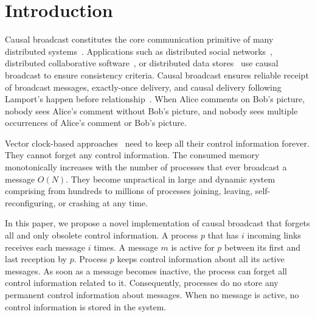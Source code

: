  
\section{Introduction}

Causal broadcast constitutes the core communication primitive of many
distributed systems~\cite{hadzilacos1994modular}. Applications such as
distributed social networks~\cite{borthakur2013petabyte}, distributed
collaborative software~\cite{heinrich2012exploiting,nedelec2016crate}, or
distributed data
stores~\cite{bailis2013bolton,bravo2017saturn,demers1987epidemic,lloyd2011cops,shapiro2011comprehensive}
use causal broadcast to ensure consistency criteria.  Causal broadcast ensures
reliable receipt of broadcast messages, exactly-once delivery, and causal
delivery following Lamport's happen before
relationship~\cite{lamport1978time}. When Alice comments on Bob's picture,
nobody sees Alice's comment without Bob's picture, and nobody sees multiple
occurrences of Alice's comment or Bob's picture.

Vector clock-based
approaches~\cite{malkhi2007concise,mukund2014optimized,nedelec2018pcbroadcast}
need to keep all their control information forever. They cannot forget any
control information.  The consumed memory monotonically increases with the
number of processes that ever broadcast a message $O(N)$.  They become
unpractical in large and dynamic system comprising from hundreds to millions of
processes joining, leaving, self-reconfiguring, or crashing at any time.

In this paper, we propose a novel implementation of causal broadcast that
forgets all and only obsolete control information. A process $p$ that has $i$
incoming links receives each message $i$ times. A message $m$ is active for $p$
between its first and last reception by $p$. Process $p$ keeps control
information about all its active messages. As soon as a message becomes
inactive, the process can forget all control information related to it.
Consequently, processes do no store any permanent control information about
messages. When no message is active, no control information is stored in the
system. 

